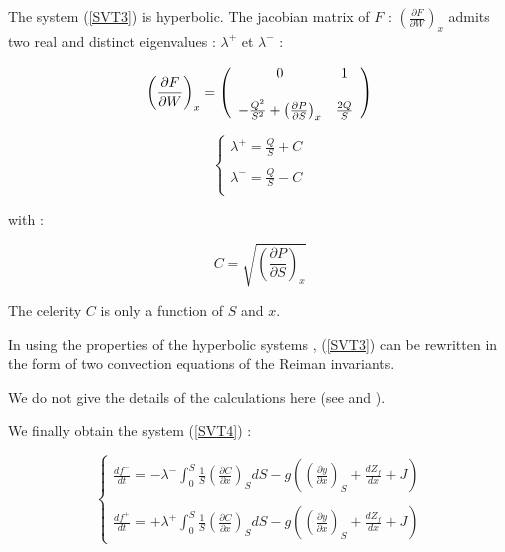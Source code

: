 The system (\ref{SVT3}) is hyperbolic. The jacobian matrix of $F$ : $\left ( \frac{\partial F}{\partial W} \right )_x$  admits two real and distinct eigenvalues : $\lambda^+$ et $\lambda^-$ :

\begin{equation}
 \left ( \frac{\partial F}{\partial W} \right )_x = \left (
    \begin{array}{c c}
    0 & 1\\
    \\
    -\frac{Q^2}{S^2} + \left ( \frac{\partial P}{\partial S} \right )_x & \frac{2 Q}{S}
\end{array}
\right )
\end{equation}

\begin{equation}
 \left \lbrace
  \begin{array}{l}
    \lambda^+ = \frac{Q}{S} + C \\
    \\
    \lambda^- = \frac{Q}{S} - C \\
  \end{array}
 \right.
\end{equation}

with :

\begin{equation}
 C = \sqrt{\left ( \frac{\partial P}{\partial S} \right )_x}
\end{equation}

The celerity $C$ is only a function of $S$ and $x$.

In using the properties of the hyperbolic systems \cite{GODLEWSKI91}\cite{AFIF86}, (\ref{SVT3}) can be rewritten in the form of two convection equations of the Reiman invariants.

We do not give the details of the calculations here (see \cite{GODLEWSKI91} and \cite{AFIF86}).

We finally obtain the system (\ref{SVT4}) :

\begin{equation}
 \label{SVT4}
 \left \lbrace
  \begin{array}{l}
    \frac{df^-}{dt} = - \lambda^- \int_{0}^S \frac{1}{S} \left ( \frac{\partial C}{\partial x}\right )_S dS - g \left ( \left ( \frac{\partial y}{\partial x} \right )_S + \frac{dZ_f}{dx} + J \right ) \\
    \\
    \frac{df^+}{dt} = + \lambda^+ \int_{0}^S \frac{1}{S} \left ( \frac{\partial C}{\partial x}\right )_S dS - g \left ( \left ( \frac{\partial y}{\partial x} \right )_S + \frac{dZ_f}{dx} + J \right )
  \end{array}
 \right.
\end{equation}


